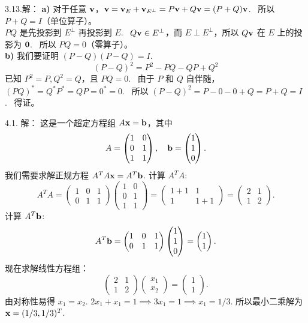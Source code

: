 \begin{exer}
3.13.解：
\textbf{a)}
对于任意 $\mathbf{v}$，$\mathbf{v} = \mathbf{v}_E + \mathbf{v}_{E^\perp} = P\mathbf{v} + Q\mathbf{v} = (P+Q)\mathbf{v}$.~
所以 $P+Q = I$（单位算子）。
\\
$PQ$ 是先投影到 $E^\perp$ 再投影到 $E$.~
$Q\mathbf{v} \in E^\perp$，而 $E \perp E^\perp$，所以 $Q\mathbf{v}$ 在 $E$ 上的投影为 $\mathbf{0}$.~
所以 $PQ = 0$（零算子）。
\\
\textbf{b)}
我们要证明 $(P-Q)(P-Q) = I$.~
$$ (P-Q)^2 = P^2 - PQ - QP + Q^2 $$
已知 $P^2=P, Q^2=Q$，且 $PQ=0$.~
由于 $P$ 和 $Q$ 自伴随，$(PQ)^* = Q^* P^* = QP = 0^* = 0$.~
所以 $(P-Q)^2 = P - 0 - 0 + Q = P + Q = I$.~
得证。

\vspace{5ex}


4.1. 解：
这是一个超定方程组 $A\mathbf{x} = \mathbf{b}$，其中
$$ A = \begin{pmatrix} 1 & 0 \\ 0 & 1 \\ 1 & 1 \end{pmatrix}, \quad \mathbf{b} = \begin{pmatrix} 1 \\ 1 \\ 0 \end{pmatrix}. $$
我们需要求解正规方程 $A^T A \mathbf{x} = A^T \mathbf{b}$.
计算 $A^T A$:
$$ A^T A = \begin{pmatrix} 1 & 0 & 1 \\ 0 & 1 & 1 \end{pmatrix} \begin{pmatrix} 1 & 0 \\ 0 & 1 \\ 1 & 1 \end{pmatrix} = \begin{pmatrix} 1+1 & 1 \\ 1 & 1+1 \end{pmatrix} = \begin{pmatrix} 2 & 1 \\ 1 & 2 \end{pmatrix}. $$
计算 $A^T \mathbf{b}$:
$$ A^T \mathbf{b} = \begin{pmatrix} 1 & 0 & 1 \\ 0 & 1 & 1 \end{pmatrix} \begin{pmatrix} 1 \\ 1 \\ 0 \end{pmatrix} = \begin{pmatrix} 1 \\ 1 \end{pmatrix}. $$
现在求解线性方程组：
$$ \begin{pmatrix} 2 & 1 \\ 1 & 2 \end{pmatrix} \begin{pmatrix} x_1 \\ x_2 \end{pmatrix} = \begin{pmatrix} 1 \\ 1 \end{pmatrix}. $$
由对称性易得 $x_1 = x_2$.
$2x_1 + x_1 = 1 \implies 3x_1 = 1 \implies x_1 = 1/3$.
所以最小二乘解为 $\mathbf{x} = (1/3, 1/3)^T$.


\end{exer}

